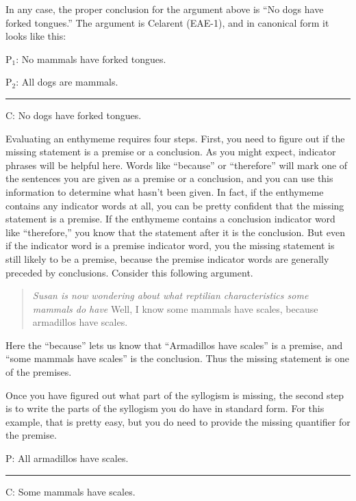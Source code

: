 In any case, the proper conclusion for the argument above is ``No dogs have forked tongues.'' The argument is Celarent (EAE-1), and in canonical form it looks like this: 

\begin{earg}
\item[P$_1$:] No mammals have forked tongues.
\item[P$_2$:] All dogs are mammals.
\vspace{-.5em}
\item [] \rule{0.4\linewidth}{.5pt} 
\item[C:] No dogs have forked tongues. 
\end{earg} 


Evaluating an enthymeme requires four steps. First, you need to figure out if the missing statement is a premise or a conclusion. As you might expect, indicator phrases will be helpful here. Words like ``because'' or ``therefore'' will mark one of the sentences you are given as a premise or a conclusion, and you can use this information to determine what hasn't been given. In fact, if the enthymeme contains any indicator words at all, you can be pretty confident that the missing statement is a premise. If the enthymeme contains a conclusion indicator word like ``therefore,'' you know that the statement after it is the conclusion. But even if the indicator word is a premise indicator word, you the missing statement is still likely to be a premise, because the premise indicator words are generally preceded by conclusions. Consider this following argument. 

\begin{quotation} \noindent\textit{Susan is now wondering about what reptilian characteristics some mammals do have} Well, I know some mammals have scales, because armadillos have scales. \end{quotation}

 Here the ``because'' lets us know that  ``Armadillos have scales'' is a premise, and ``some mammals have scales'' is the conclusion. Thus the missing statement is one of the premises. 

Once you have figured out what part of the syllogism is missing, the second step is to write the parts of the syllogism you do have in standard form. For this example, that is pretty easy, but you do need to provide the missing quantifier for the premise.

\begin{earg}
\item[P:] All armadillos have scales.
\vspace{-.5em}
\item [] \rule{0.3\linewidth}{.5pt} 
\item[C:] Some mammals have scales. 
\end{earg}

